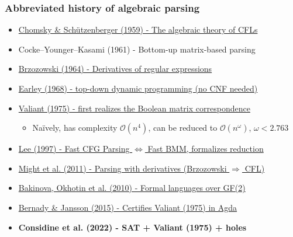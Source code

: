 \documentclass{beamer}
\begin{document}
    \begin{frame}
        \frametitle{Abbreviated history of algebraic parsing}
        \begin{itemize}
            \item \href{http://www-igm.univ-mlv.fr/~berstel/Mps/Travaux/A/1963-7ChomskyAlgebraic.pdf}{Chomsky \& Sch\"utzenberger (1959) - The algebraic theory of CFLs}
            \item Cocke–Younger–Kasami (1961) - Bottom-up matrix-based parsing
            \item \href{https://dl.acm.org/doi/10.1145/321239.321249}{Brzozowski (1964) - Derivatives of regular expressions}
            \item \href{https://dl.acm.org/doi/10.1145/362007.362035}{Earley (1968) - top-down dynamic programming (no CNF needed)}
            \item \href{http://theory.stanford.edu/~virgi/cs367/papers/valiantcfg.pdf}{Valiant (1975) - first realizes the Boolean matrix correspondence}
            \begin{itemize}
                \item Na\"ively, has complexity $\mathcal{O}(n^4)$, can be reduced to $\mathcal{O}(n^\omega)$, $\omega < 2.763$
            \end{itemize}
            \item \href{https://www.cs.cornell.edu/home/llee/papers/bmmcfl-jacm.pdf}{Lee (1997) - Fast CFG Parsing $\Longleftrightarrow$ Fast BMM, formalizes reduction}
            \item \href{https://matt.might.net/papers/might2011derivatives.pdf}{Might et al. (2011) - Parsing with derivatives (Brzozowski $\Rightarrow$ CFL)}
            \item \href{https://users.math-cs.spbu.ru/~okhotin/papers/formal_languages_gf2.pdf}{Bakinova, Okhotin et al. (2010) - Formal languages over GF(2)}
            \item \href{https://arxiv.org/pdf/1601.07724.pdf}{Bernady \& Jansson (2015) - Certifies Valiant (1975) in Agda}
            \item \textbf{Considine et al. (2022) - SAT + Valiant (1975) + holes}
        \end{itemize}
    \end{frame}

%
\end{document}
